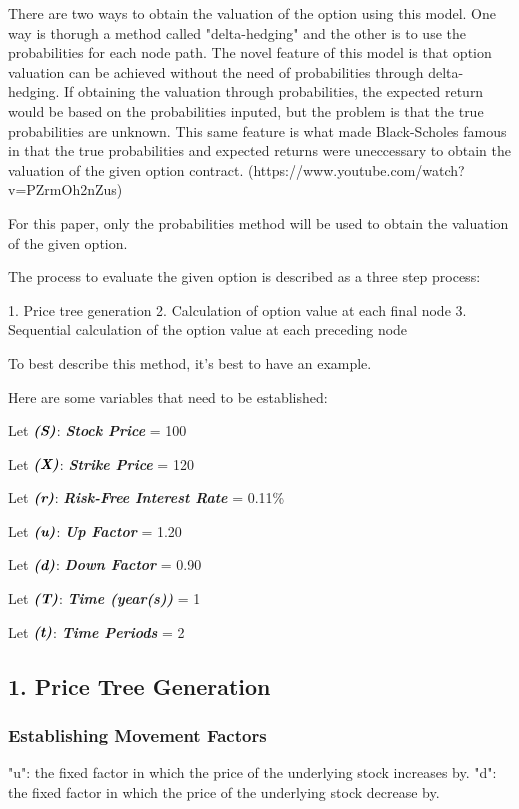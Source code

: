 \documentclass[12pt, letterpaper]{article}
\begin{document}
There are two ways to obtain the valuation of the option using this model.
One way is thorugh a method called "delta-hedging" and the other is to use the probabilities for each node path.
The novel feature of this model is that option valuation can be achieved without the need of probabilities through delta-hedging.
If obtaining the valuation through probabilities, the expected return would be based on the probabilities inputed, but the problem is that the true probabilities are unknown.
This same feature is what made Black-Scholes famous in that the true probabilities and expected returns were uneccessary to obtain the valuation of the given option contract. (https://www.youtube.com/watch?v=PZrmOh2nZus)

For this paper, only the probabilities method will be used to obtain the valuation of the given option. 

The process to evaluate the given option is described as a three step process: %

1. Price tree generation
2. Calculation of option value at each final node
3. Sequential calculation of the option value at each preceding node

To best describe this method, it's best to have an example.

Here are some variables that need to be established:

Let ${\textit{\textbf{(S)}}}$: \textit{\textbf{Stock Price}} = 100

Let ${\textit{\textbf{(X)}}}$: \textit{\textbf{Strike Price}} = 120

Let ${\textit{\textbf{(r)}}}$: \textit{\textbf{Risk-Free Interest Rate}} = 0.11\%

Let ${\textit{\textbf{(u)}}}$: \textit{\textbf{Up Factor}} = 1.20

Let ${\textit{\textbf{(d)}}}$: \textit{\textbf{Down Factor}} = 0.90

Let ${\textit{\textbf{(T)}}}$: \textit{\textbf{Time (year(s))}}  = 1

Let ${\textit{\textbf{(t)}}}$: \textit{\textbf{Time Periods}}  = 2 

\subsection*{1. Price Tree Generation}
\subsubsection*{Establishing Movement Factors}
"u": the fixed factor in which the price of the underlying stock increases by.
"d": the fixed factor in which the price of the underlying stock decrease by.
\end{document}
